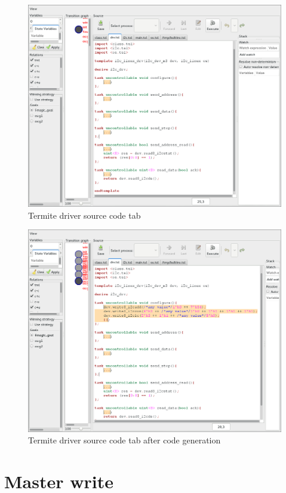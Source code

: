 \begin{figure}
    \center
    \includegraphics[width=\linewidth]{imgs/screenshot_1.png}
    \caption{Termite driver source code tab}
    \label{fig:driver_tab}
\end{figure}

\begin{figure}
    \center
    \includegraphics[width=\linewidth]{imgs/screenshot_2.png}
    \caption{Termite driver source code tab after code generation}
    \label{fig:driver_tab_gen}
\end{figure}

\section{Master write}
\label{a:sec_master_write}

